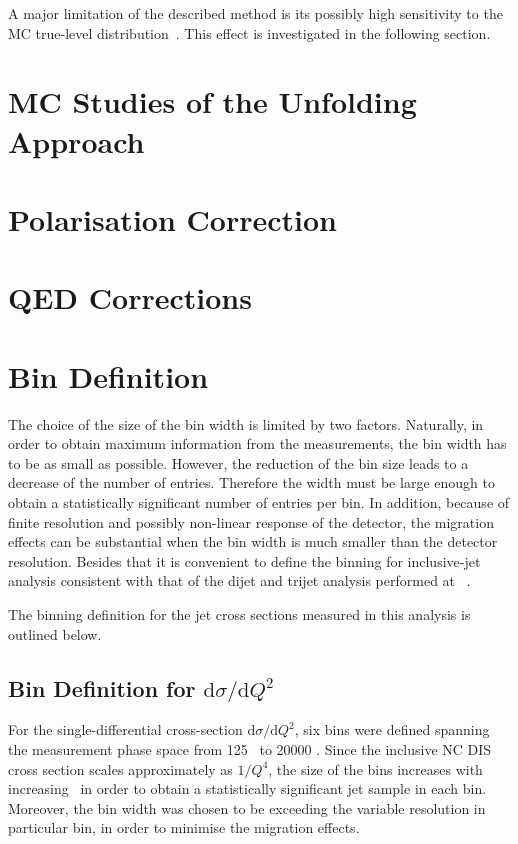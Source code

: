 A major limitation of the described method is its possibly high sensitivity to the MC true-level distribution~\cite{Cowan:2002in}. This effect is investigated in the following section.

\section{MC Studies of the Unfolding Approach}
\label{sec:mcvalidation}


\section{Polarisation Correction}
\label{sec:polcor}

 
\section{QED Corrections}
\label{sec:qedcor}


\section{Bin Definition}
\label{sec:bindef}
The choice of the size of the bin width is limited by two factors. Naturally, in order to obtain maximum information from the measurements, the bin width has to be as small as possible. However, the reduction of the bin size leads to a decrease of the number of entries. Therefore the width must be large enough to obtain a statistically significant number of entries per bin. In addition, because of finite resolution and possibly non-linear response of the detector, the migration effects can be substantial when the bin width is much smaller than the detector resolution. Besides that it is convenient to define the binning for inclusive-jet analysis consistent with that of the dijet and trijet analysis performed at \zeus~\cite{thesis:behr:2010,thesis:makarenko:2015}.

The binning definition for the jet cross sections measured in this analysis is outlined below.
\subsection*{Bin Definition for ${\mathrm{d}\sigma}/{\mathrm{d}Q^2}$}
\label{subsec:bindefq2}
For the single-differential cross-section ${\mathrm{d}\sigma}/{\mathrm{d}Q^2}$, six bins were defined spanning the measurement phase space from 125 \GeV~to 20000 \GeV. Since the inclusive NC DIS cross section scales approximately as $1/Q^4$, the size of the bins increases with increasing \qsq~in order to obtain a statistically significant jet sample in each bin. Moreover, the bin width was chosen to be exceeding the variable resolution in particular bin, in order to minimise the migration effects.
